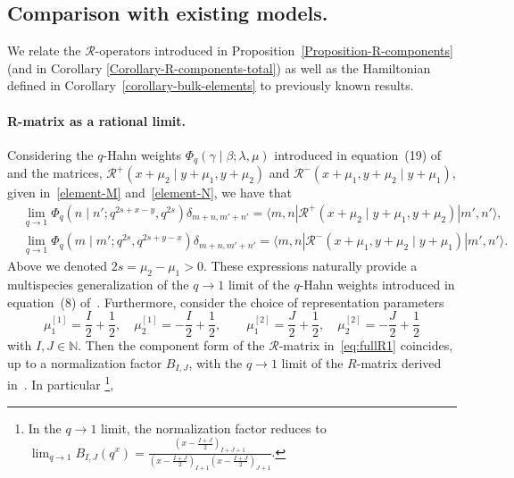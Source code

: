 \documentclass[11pt]{article}
\numberwithin{equation}{section}
\newcommand{\eR}{\mathcal{R}}
\begin{document}
                 
    

\subsection{Comparison with existing models.}

We relate the $\eR$-operators introduced in Proposition~\ref{Proposition-R-components} (and in Corollary \ref{Corollary-R-components-total}) as well as the Hamiltonian defined in Corollary~\ref{corollary-bulk-elements} to previously known results.

                                           
                              
    \paragraph{R-matrix as a rational limit.}
   Considering the $q$-Hahn weights $\Phi_q(\gamma\mid\beta;\lambda,\mu)$ introduced in equation~(19) of~\cite{Kuniba:2016fpi} and the matrices, 
     $\eR^{+}(x+\mu_{2}\mid y+\mu_{1},y+\mu_{2})$ and 
    $\eR^{-}(x+\mu_{1},y+\mu_{2}\mid y+\mu_{1})$,  given in~\eqref{element-M} and~\eqref{element-N}, we have that
    \begin{equation}
    \begin{split}
        &\lim_{q\to 1}\Phi_q(n\mid n';q^{2s+x-y},q^{2s})\delta_{m+n,m'+n'}
        = \langle m,n|\eR^{+}(x+\mu_{2}\mid y+\mu_{1},y+\mu_{2})|m',n'\rangle, \\
        &\lim_{q\to 1}\Phi_q(m\mid m';q^{2s},q^{2s+y-x})\delta_{m+n,m'+n'}
        = \langle m,n|\eR^{-}(x+\mu_{1},y+\mu_{2}\mid y+\mu_{1})|m',n'\rangle.
    \end{split}
    \end{equation}
    Above we denoted $2s=\mu_{2}-\mu_{1}>0$. These expressions naturally provide a multispecies generalization of the $q\to 1$ limit of the $q$-Hahn weights introduced in equation~(8) of~\cite{povolotsky2013integrability}.
    Furthermore, consider the choice of representation parameters
    \begin{equation}\label{label-choice-compact}
        \mu_{1}^{[1]}=\frac{I}{2}+\frac{1}{2},\quad 
        \mu_{2}^{[1]}=-\frac{I}{2}+\frac{1}{2},\qquad
        \mu_{1}^{[2]}=\frac{J}{2}+\frac{1}{2},\quad 
        \mu_{2}^{[2]}=-\frac{J}{2}+\frac{1}{2}
    \end{equation}
    with $I,J\in \mathbb{N}$.
    Then the component form of the $\eR$-matrix in~\eqref{eq:fullR1} coincides, up to a normalization factor $B_{I,J}$, with the $q\to 1$ limit of the $R$-matrix derived in~\cite[(3.16)--(3.17)]{Kuniba:2016fpi,Bosnjak:2016oze}. In particular \footnote{In the $q\to 1$ limit, the normalization factor reduces to
$        \lim_{q\to 1}B_{I,J}(q^{x})
        = \frac{\left(x-\frac{I+J}{2}\right)_{I+J+1}}
        {\left(x-\frac{I+J}{2}\right)_{I+1}\left(x-\frac{I+J}{2}\right)_{J+1}}
    $. },
\end{document}
